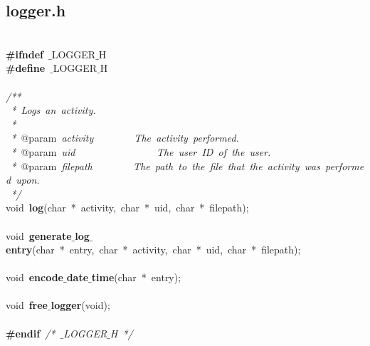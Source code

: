 \subsection{logger.h}
\scriptsize
\sffamily
\noindent
\mbox{} \\
\mbox{}\textbf{\#ifndef}\ $\_$LOGGER$\_$H \\
\mbox{}\textbf{\#define}\ $\_$LOGGER$\_$H \\
\mbox{} \\
\mbox{}\textit{/**} \\
\mbox{}\textit{\ *\ Logs\ an\ activity.} \\
\mbox{}\textit{\ *} \\
\mbox{}\textit{\ *\ }@param\textit{\ activity\ \ \ \ \ \ \ \ The\ activity\ performed.} \\
\mbox{}\textit{\ *\ }@param\textit{\ uid\ \ \ \ \ \ \ \ \ \ \ \ \ \ \ \ The\ user\ ID\ of\ the\ user.} \\
\mbox{}\textit{\ *\ }@param\textit{\ filepath\ \ \ \ \ \ \ \ The\ path\ to\ the\ file\ that\ the\ activity\ was\ performed\ upon.} \\
\mbox{}\textit{\ */} \\
\mbox{}void\ \textbf{log}(char\ *\ activity,\ char\ *\ uid,\ char\ *\ filepath); \\
\mbox{} \\
\mbox{}void\ \textbf{generate$\_$log$\_$entry}(char\ *\ entry,\ char\ *\ activity,\ char\ *\ uid,\ char\ *\ filepath); \\
\mbox{} \\
\mbox{}void\ \textbf{encode$\_$date$\_$time}(char\ *\ entry); \\
\mbox{} \\
\mbox{}void\ \textbf{free$\_$logger}(void); \\
\mbox{} \\
\mbox{}\textbf{\#endif}\ \textit{/*\ $\_$LOGGER$\_$H\ */} \\

\clearpage
\normalsize
\rmfamily
